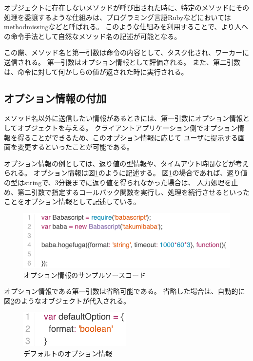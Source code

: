 オブジェクトに存在しないメソッドが呼び出された時に、特定のメソッドにその処理を委譲するような仕組みは、プログラミング言語Rubyなどにおいては
methodmissingなどと呼ばれる。
このような仕組みを利用することで、より人への命令手法として自然なメソッド名の記述が可能となる。

この際、メソッド名と第一引数は命令の内容として、タスク化され、ワーカーに送信される。
第一引数はオプション情報として評価される。
また、第二引数は、命令に対して何かしらの値が返された時に実行される。

\subsection{オプション情報の付加}\label{ux30aaux30d7ux30b7ux30e7ux30f3ux60c5ux5831ux306eux4ed8ux52a0}

メソッド名以外に送信したい情報があるときには、第一引数にオプション情報としてオブジェクトを与える。
クライアントアプリケーション側でオプション情報を得ることができるため、このオプション情報に応じて
ユーザに提示する画面を変更するといったことが可能である。

オプション情報の例としては、返り値の型情報や、タイムアウト時間などが考えられる。
オプション情報は図\ref{fig:babascript_option}のように記述する。
図\ref{fig:babascript_option}の場合であれば、返り値の型はstringで、3分後までに返り値を得られなかった場合は、
人力処理を止め、第二引数で指定するコールバック関数を実行し、処理を続行させるといったことをオプション情報として記述している。

\begin{figure}[htbp]
  \begin{center}
  \includegraphics[width=.8\linewidth,bb=0 0 563 149]{images/babascript_option_sample.js.png}
  \end{center}
  \caption{オプション情報のサンプルソースコード}
  \label{fig:babascript_option}
\end{figure}

オプション情報である第一引数は省略可能である。
省略した場合は、自動的に図\ref{fig:option_default}のようなオブジェクトが代入される。

\begin{figure}[htbp]
  \begin{center}
  \includegraphics[width=.4\linewidth,bb=0 0 210 70]{images/option_default.js.png}
  \end{center}
  \caption{デフォルトのオプション情報}
  \label{fig:option_default}
\end{figure}


